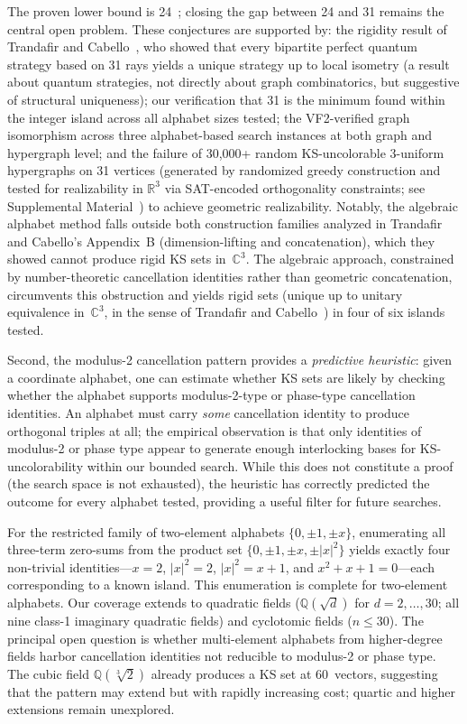 \documentclass[twocolumn,prl,superscriptaddress,nofootinbib]{revtex4-2}
\newcommand{\R}{\mathbb{R}}
\newcommand{\C}{\mathbb{C}}
\newcommand{\Q}{\mathbb{Q}}
\begin{document}
The proven lower bound is 24~\cite{LiBrightGanesh2024,KirchwegarPeitlSzeider2023}; closing the gap between 24 and 31 remains the central open problem.  These conjectures are supported by: the rigidity result of Trandafir and Cabello~\cite{TrandafirCabello2025}, who showed that every bipartite perfect quantum strategy based on 31 rays yields a unique strategy up to local isometry (a result about quantum strategies, not directly about graph combinatorics, but suggestive of structural uniqueness); our verification that 31 is the minimum found within the integer island across all alphabet sizes tested; the VF2-verified graph isomorphism across three alphabet-based search instances at both graph and hypergraph level; and the failure of 30{,}000+ random KS-uncolorable 3-uniform hypergraphs on 31 vertices (generated by randomized greedy construction and tested for realizability in $\R^3$ via SAT-encoded orthogonality constraints; see Supplemental Material~\cite{SupplementalMaterial}) to achieve geometric realizability.  Notably, the algebraic alphabet method falls outside both construction families analyzed in Trandafir and Cabello's Appendix~B (dimension-lifting and concatenation), which they showed cannot produce rigid KS sets in~$\C^3$.  The algebraic approach, constrained by number-theoretic cancellation identities rather than geometric concatenation, circumvents this obstruction and yields rigid sets (unique up to unitary equivalence in~$\C^3$, in the sense of Trandafir and Cabello~\cite{TrandafirCabello2025}) in four of six islands tested.

Second, the modulus-2 cancellation pattern provides a \emph{predictive heuristic}: given a coordinate alphabet, one can estimate whether KS sets are likely by checking whether the alphabet supports modulus-2-type or phase-type cancellation identities.  An alphabet must carry \emph{some} cancellation identity to produce orthogonal triples at all; the empirical observation is that only identities of modulus-2 or phase type appear to generate enough interlocking bases for KS-uncolorability within our bounded search.  While this does not constitute a proof (the search space is not exhausted), the heuristic has correctly predicted the outcome for every alphabet tested, providing a useful filter for future searches.

For the restricted family of two-element alphabets $\{0, \pm 1, \pm x\}$, enumerating all three-term zero-sums from the product set $\{0, \pm 1, \pm x, \pm |x|^2\}$ yields exactly four non-trivial identities---$x = 2$, $|x|^2 = 2$, $|x|^2 = x + 1$, and $x^2 + x + 1 = 0$---each corresponding to a known island.  This enumeration is complete for two-element alphabets.  Our coverage extends to quadratic fields ($\Q(\sqrt{d})$ for $d = 2, \ldots, 30$; all nine class-1 imaginary quadratic fields) and cyclotomic fields ($n \leq 30$).  The principal open question is whether multi-element alphabets from higher-degree fields harbor cancellation identities not reducible to modulus-2 or phase type.  The cubic field $\Q(\sqrt[3]{2})$ already produces a KS set at 60~vectors, suggesting that the pattern may extend but with rapidly increasing cost; quartic and higher extensions remain unexplored.
\end{document}
